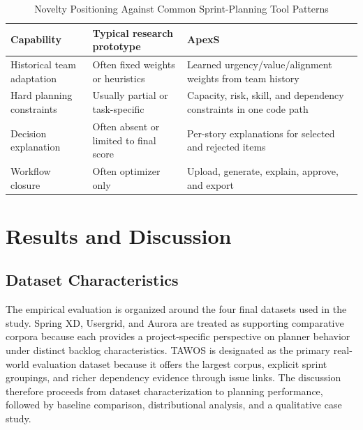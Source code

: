 \documentclass[conference]{IEEEtran}
\begin{document}
\begin{table}[t]
	\caption{Novelty Positioning Against Common Sprint-Planning Tool Patterns}
	\label{tab:novelty-summary}
	\centering\small
	\begin{tabularx}{\columnwidth}{lYY}
		\toprule
		Capability                             & Typical research prototype & ApexS \\
		\midrule
		Historical team adaptation             &
		Often fixed weights or heuristics      &
		Learned urgency/value/alignment weights from team history                   \\
		Hard planning constraints              &
		Usually partial or task-specific       &
		Capacity, risk, skill, and dependency constraints in one code path          \\
		Decision explanation                   &
		Often absent or limited to final score &
		Per-story explanations for selected and rejected items                      \\
		Workflow closure                       &
		Often optimizer only                   &
		Upload, generate, explain, approve, and export                              \\
		\bottomrule
	\end{tabularx}
\end{table}

\section{Results and Discussion}
\label{sec:results}

\subsection{Dataset Characteristics}

The empirical evaluation is organized around the four final datasets used in the
study.
Spring XD, Usergrid, and Aurora are treated as supporting comparative corpora
because each provides a project-specific perspective on planner behavior under
distinct backlog characteristics.
TAWOS is designated as the primary real-world evaluation dataset because it offers
the largest corpus, explicit sprint groupings, and richer dependency evidence
through issue links.
The discussion therefore proceeds from dataset characterization to planning
performance, followed by baseline comparison, distributional analysis, and a
qualitative case study.
\end{document}
